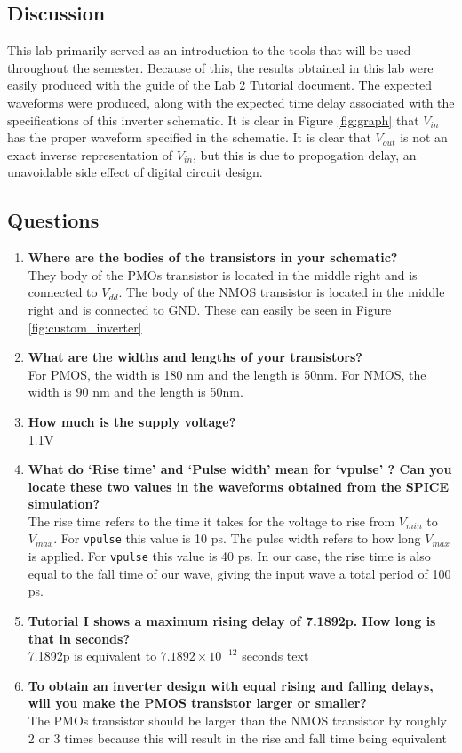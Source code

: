 \documentclass[12pt]{article}
\begin{document}
\subsection{Discussion}
This lab primarily served as an introduction to the tools that will be used throughout the semester. Because of this, the results obtained in this lab were easily produced with the guide of the Lab 2 Tutorial document. The expected waveforms were produced, along with the expected time delay associated with the specifications of this inverter schematic. It is clear in Figure \ref{fig:graph} that $V_{in}$ has the proper waveform specified in the schematic. It is clear that  $V_{out}$ is not an exact inverse representation of $V_{in}$, but this is due to propogation delay, an unavoidable side effect of digital circuit design.
\subsection{Questions}
\begin{enumerate}
	\item \textbf{Where are the bodies of the transistors in your schematic?} \\
	They body of the PMOs transistor is located in the middle right and is connected to $V_{dd}$. The body of the NMOS transistor is located in the middle right and is connected to GND. These can easily be seen in Figure \ref{fig:custom_inverter}
	
	\item \textbf{What are the widths and lengths of your transistors?}\\
	For PMOS, the width is 180 nm and the length is 50nm. For NMOS, the width is 90 nm and the length is 50nm.
	
	\item \textbf{How much is the supply voltage?}\\
	1.1V
	
	\item \textbf{What do ‘Rise time’ and ‘Pulse width’ mean for ‘vpulse’ ? Can you locate these two values in the waveforms obtained from the SPICE simulation?} \\
	The rise time refers to the time it takes for the voltage to rise from $V_{min}$ to $V_{max}$. For \texttt{vpulse} this value is 10 ps. The pulse width refers to how long $V_{max}$ is applied. For \texttt{vpulse} this value is 40 ps. In our case, the rise time is also equal to the fall time of our wave, giving the input wave a total period of 100 ps.
	
	\item \textbf{Tutorial I shows a maximum rising delay of 7.1892p. How long is that in seconds?}\\
	7.1892p is equivalent to $7.1892 \times 10^{-12}$ seconds
	text
	\item \textbf{To obtain an inverter design with equal rising and falling delays, will you make the PMOS transistor larger or smaller?}\\
	The PMOs transistor should be larger than the NMOS transistor by roughly 2 or 3 times because this will result in the rise and fall time being equivalent 
\end{enumerate}
\end{document}
